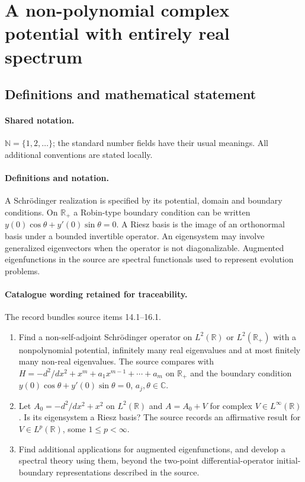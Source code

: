 \documentclass[11pt]{article}
\begin{document}
\section{A non-polynomial complex potential with entirely real spectrum}\label{statement}

\subsection{Definitions and mathematical statement}

\paragraph{Shared notation.}$\mathbb N=\{1,2,\ldots\}$; the standard number fields have their usual meanings. All additional conventions are stated locally.


\paragraph{Definitions and notation.}A Schrödinger realization is specified by its potential, domain and boundary conditions. On $\mathbb R_+$ a Robin-type boundary condition can be written $y(0)\cos\theta+y'(0)\sin\theta=0$. A Riesz basis is the image of an orthonormal basis under a bounded invertible operator. An eigensystem may involve generalized eigenvectors when the operator is not diagonalizable. Augmented eigenfunctions in the source are spectral functionals used to represent evolution problems.

\paragraph{Catalogue wording retained for traceability.}
The record bundles source items 14.1--16.1.
\begin{enumerate}
\item Find a non-self-adjoint Schrödinger operator on $L^2(\mathbb R)$ or $L^2(\mathbb R_+)$ with a nonpolynomial potential, infinitely many real eigenvalues and at most finitely many non-real eigenvalues. The source compares with $H=-d^2/dx^2+x^m+a_1x^{m-1}+\cdots+a_m$ on $\mathbb R_+$ and the boundary condition $y(0)\cos\theta+y'(0)\sin\theta=0$, $a_j,\theta\in\mathbb C$.
\item Let $A_0=-d^2/dx^2+x^2$ on $L^2(\mathbb R)$ and $A=A_0+V$ for complex $V\in L^\infty(\mathbb R)$. Is its eigensystem a Riesz basis? The source records an affirmative result for $V\in L^p(\mathbb R)$, some $1\le p<\infty$.
\item Find additional applications for augmented eigenfunctions, and develop a spectral theory using them, beyond the two-point differential-operator initial-boundary representations described in the source.
\end{enumerate}
\end{document}
